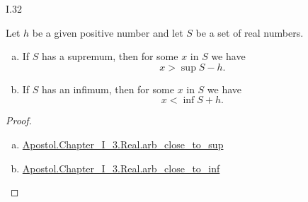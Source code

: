 \documentclass{article}
\begin{document}
\begin{xtheorem}{I.32}

  Let $h$ be a given positive number and let $S$ be a set of real numbers.
  \begin{enumerate}[(a)]
    \item If $S$ has a supremum, then for some $x$ in $S$ we have
      $$x > \sup{S} - h.$$
    \item If $S$ has an infimum, then for some $x$ in $S$ we have
      $$x < \inf{S} + h.$$
  \end{enumerate}

\end{xtheorem}

\begin{proof}

  \  %

  \begin{enumerate}[(a)]
    \item \href{Chapter_I_3.lean}{Apostol.Chapter_I_3.Real.arb_close_to_sup}
    \item \href{Chapter_I_3.lean}{Apostol.Chapter_I_3.Real.arb_close_to_inf}
  \end{enumerate}

\end{proof}
\end{document}
